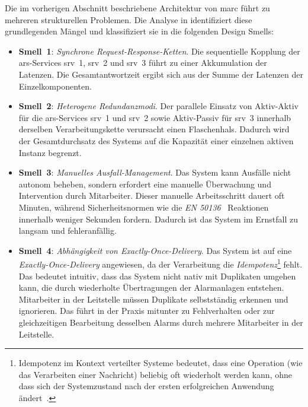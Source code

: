 Die im vorherigen Abschnitt beschriebene Architektur von \gls{marc} führt zu mehreren strukturellen Problemen. Die Analyse in \citep{liebig_2025_architectural_refactoring} identifiziert diese grundlegenden Mängel und klassifiziert sie in die folgenden Design Smells:
\begin{itemize}
    \item \textbf{Smell~1}: \textit{Synchrone Request-Response-Ketten}. Die sequentielle Kopplung der \gls{ars}-Services \gls{srv}~1, \gls{srv}~2 und \gls{srv}~3 führt zu einer Akkumulation der Latenzen. Die Gesamtantwortzeit ergibt sich aus der Summe der Latenzen der Einzelkomponenten.

    \item \textbf{Smell~2}: \textit{Heterogene Redundanzmodi}. Der parallele Einsatz von Aktiv-Aktiv für die \gls{ars}-Services \gls{srv}~1 und \gls{srv}~2 sowie Aktiv-Passiv für \gls{srv}~3 innerhalb derselben Verarbeitungskette verursacht einen Flaschenhals. Dadurch wird der Gesamtdurchsatz des Systems auf die Kapazität einer einzelnen aktiven Instanz begrenzt.

    \item \textbf{Smell~3}: \textit{Manuelles Ausfall-Management}. Das System kann Ausfälle nicht autonom beheben, sondern erfordert eine manuelle Überwachung und Intervention durch Mitarbeiter. Dieser manuelle Arbeitsschritt dauert oft Minuten, während Sicherheitsnormen wie die \textit{EN 50136}~\citep{din_en_50136-12012-08_alarm_2012} Reaktionen innerhalb weniger Sekunden fordern. Dadurch ist das System im Ernstfall zu langsam und fehleranfällig.

    \item \textbf{Smell~4}: \textit{Abhängigkeit von Exactly-Once-Delivery}. Das System ist auf eine \textit{Exactly-Once-Delivery} angewiesen, da der Verarbeitung die \textit{Idempotenz}\footnote{Idempotenz im Kontext verteilter Systeme bedeutet, dass eine Operation (wie das Verarbeiten einer Nachricht) beliebig oft wiederholt werden kann, ohne dass sich der Systemzustand nach der ersten erfolgreichen Anwendung ändert~\citep{helland2012idempotence}.} fehlt. Das bedeutet intuitiv, dass das System nicht nativ mit Duplikaten umgehen kann, die durch wiederholte Übertragungen der Alarmanlagen entstehen. Mitarbeiter in der Leitstelle müssen Duplikate selbstständig erkennen und ignorieren. Das führt in der Praxis mitunter zu Fehlverhalten oder zur gleichzeitigen Bearbeitung desselben Alarms durch mehrere Mitarbeiter in der Leitstelle.


\end{itemize}
